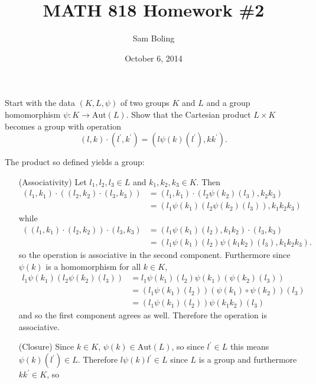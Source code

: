 \documentclass{article}
\title{MATH 818 Homework \#2}
\date{October 6, 2014}
\author{Sam Boling}
\newcounter{Problem}
\newenvironment{Problem}{\begin{Exercise}[name={Problem},
                                          counter={Problem}]}
                        {\end{Exercise}}
\begin{document}
\begin{titlepage}
\maketitle
\end{titlepage}

\begin{Problem}
Start with the data $(K, L, \psi)$ of two groups $K$ and $L$ and a
group homomorphism $\psi : K \to \mathrm{Aut}(L)$. Show that the
Cartesian product $L \times K$ becomes a group with operation
$$
(l, k) \cdot (l^\prime, k^\prime) = (l\psi(k)(l^\prime), k k^\prime).
$$
\end{Problem}

\begin{Answer}
The product so defined yields a group:
\begin{itemize}
  \item[(Associativity)]
    {Let $l_1, l_2, l_3 \in L$ and $k_1, k_2, k_3 \in K$. Then
     \begin{align*}
       (l_1, k_1) \cdot ((l_2, k_2) \cdot (l_3, k_3))
    &= (l_1, k_1) \cdot
       (l_2 \psi(k_2) (l_3), k_2 k_3) \\
    &= (l_1 \psi(k_1)(l_2 \psi(k_2) (l_3)), k_1 k_2 k_3)
    \end{align*}
    while
    \begin{align*}
      ((l_1, k_1) \cdot (l_2, k_2)) \cdot (l_3, k_3) 
   &= (l_1 \psi(k_1)(l_2), k_1 k_2) \cdot (l_3, k_3) \\
   &= (l_1 \psi(k_1)(l_2)
       \psi(k_1 k_2) (l_3), k_1 k_2 k_3).
    \end{align*}
    so the operation is associative in the second component.
    Furthermore since $\psi(k)$ is a homomorphism for all $k \in K$,
    \begin{align*}
     l_1 \psi(k_1)(l_2 \psi(k_2)(l_3))
  &= l_1 \psi(k_1)(l_2) \psi(k_1)(\psi(k_2)(l_3)) \\
  &= (l_1 \psi(k_1)(l_2))
      (\psi(k_1) \circ \psi(k_2))(l_3)\\
  &= (l_1 \psi(k_1)(l_2))
      \psi(k_1 k_2)(l_3)
     \end{align*}
     and so the first component agrees as well. Therefore the
     operation is associative.
    }
  \item[(Closure)]
    {
      Since $k \in K$, $\psi(k) \in \mathrm{Aut}(L)$, so
      since $l^\prime \in L$ this means $\psi(k)(l^\prime) \in
      L$. Therefore $l \psi(k) l^\prime \in L$ since $L$ is a group
      and furthermore $k k^\prime \in K$, so 
}
\end{itemize}
\end{Answer}
\end{document}
